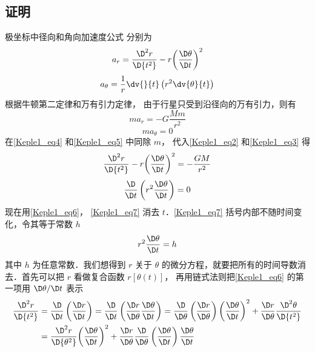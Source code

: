 \subsection{证明}
极坐标中径向和角向加速度公式%
分别为
\begin{equation}\label{Keple1_eq2}
{a_r} = \frac{{{\D^2}r}}{{\D{t^2}}} - r{\left( {\frac{{\D\theta }}{{\D t}}} \right)^2}
\end{equation}
\begin{equation}\label{Keple1_eq3}
a_\theta = \frac{1}{r}\dv{}{t}\left(r^2\dv{\theta}{t} \right)
\end{equation}
根据牛顿第二定律和万有引力定律，%
由于行星只受到沿径向的万有引力，则有
\begin{equation}\label{Keple1_eq4}
m{a_r} =  - G\frac{Mm}{r^2}
\end{equation}
\begin{equation}\label{Keple1_eq5}
m{a_\theta } = 0
\end{equation}
在\autoref{Keple1_eq4} 和\autoref{Keple1_eq5} 中同除 $m$，  代入\autoref{Keple1_eq2} 和\autoref{Keple1_eq3} 得
\begin{equation}\label{Keple1_eq6}
\frac{{{\D^2}r}}{{\D{t^2}}} - r{\left( {\frac{{\D\theta }}{{\D t}}} \right)^2} =  - \frac{{GM}}{{{r^2}}}
\end{equation}
\begin{equation}\label{Keple1_eq7}
\frac{\D}{{\D t}}\left( {{r^2}\frac{{\D\theta }}{{\D t}}} \right) = 0
\end{equation}
现在用\autoref{Keple1_eq6}， \autoref{Keple1_eq7} 消去 $t$．\autoref{Keple1_eq7} 括号内部不随时间变化，令其等于常数 $h$
\begin{equation}\label{Keple1_eq8}
{r^2}\frac{{\D\theta }}{{\D t}} = h
\end{equation}
其中 $h$ 为任意常数．我们想得到 $r$ 关于 $\theta$ 的微分方程，就要把所有的时间导数消去．首先可以把 $r$ 看做复合函数 $r[\theta(t)]$， 再用链式法则把\autoref{Keple1_eq6} 的第一项用 $\D\theta/\D t$ 表示
\begin{equation}\label{Keple1_eq10}
\begin{aligned}
\frac{{{\D^2}r}}{{\D{t^2}}} & = \frac{\D}{{\D t}}\left(\frac{{\D r}}{{\D t}}\right) = \frac{\D}{{\D t}}\left( {\frac{{\D r}}{{\D\theta }}\frac{{\D\theta }}{{\D t}}} \right) = \frac{\D}{{\D\theta }}\left( {\frac{{\D r}}{{\D\theta }}} \right){\left( {\frac{{\D\theta }}{{\D t}}} \right)^2} + \frac{{\D r}}{{\D\theta }}\frac{{{\D^2}\theta }}{{\D{t^2}}}\\
& = \frac{{{\D^2}r}}{{\D{\theta ^2}}}{\left( {\frac{{\D\theta }}{{\D t}}} \right)^2} + \frac{{\D r}}{{\D\theta }}\frac{\D}{{\D\theta }}\left( {\frac{{\D\theta }}{{\D t}}} \right)\frac{{\D\theta }}{{\D t}}
\end{aligned}
\end{equation}
